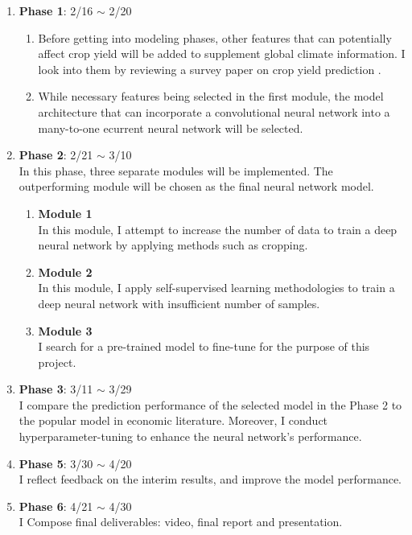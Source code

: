 \documentclass[11pt, oneside]{article}   	%
\begin{document}
\begin{enumerate}
\item \textbf{Phase 1}: 2/16 $\sim$ 2/20
	\begin{enumerate}[label=(\alph*)]
	\item Before getting into modeling phases, other features that can potentially affect crop yield will be added to supplement global climate information. I look into them by reviewing a survey paper on crop yield prediction \cite{citation_key3}.
	\item While necessary features being selected in the first module, the model architecture that can incorporate a convolutional neural network into a many-to-one ecurrent neural network will be selected.
	\end{enumerate}

\item \textbf{Phase 2}: 2/21 $\sim$ 3/10 \\
In this phase, three separate modules will be implemented. The outperforming module will be chosen as the final neural network model.
	\begin{enumerate}[label=(\alph*)]
	\item \textbf{Module 1} \\
	In this module, I attempt to increase the number of data to train a deep neural network by applying methods such as cropping.
	\item \textbf{Module 2} \\
	In this module, I apply self-supervised learning methodologies to train a deep neural network with insufficient number of samples.
	\item \textbf{Module 3} \\
	I search for a pre-trained model to fine-tune for the purpose of this project.
	\end{enumerate}

\item \textbf{Phase 3}: 3/11 $\sim$ 3/29 \\
I compare the prediction performance of the selected model in the Phase 2 to the popular model in economic literature. Moreover, I conduct hyperparameter-tuning to enhance the neural network's performance.

\item \textbf{Phase 5}: 3/30 $\sim$ 4/20 \\
I reflect feedback on the interim results, and improve the model performance.

\item \textbf{Phase 6}: 4/21 $\sim$ 4/30 \\
I Compose final deliverables: video, final report and presentation.
\end{enumerate}
\end{document}
